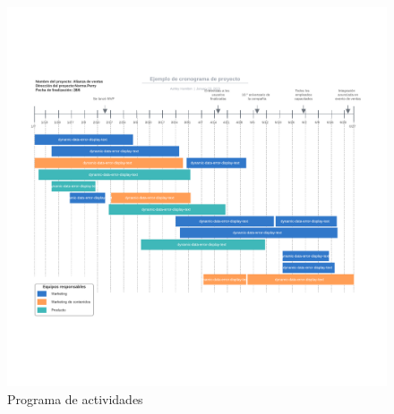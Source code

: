 \documentclass[letterpaper,12pt,oneside]{article}
\begin{document}
\begin{figure}[h]
    \centering
    \includegraphics[scale=0.5]{cronograma.png} %
    \caption{Programa de actividades}
    \label{fig:cron}
\end{figure}

\end{document}
